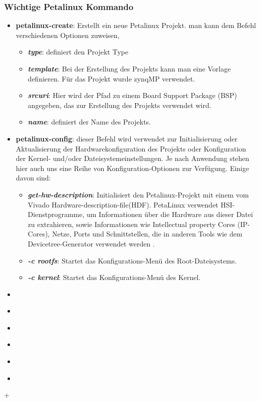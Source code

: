 \subsubsection{Wichtige Petalinux Kommando}
\begin{itemize}
	\item \textbf{petalinux-create}: Erstellt ein neue Petalinux Projekt. man kann dem Befehl verschiedenen Optionen zuweisen, 
	\begin{itemize}
		\item \textbf{\emph{type}}: definiert den Projekt Type
		\item \textbf{\emph{template}}: Bei der Erstellung des Projekts kann man eine Vorlage definieren. Für das Projekt wurde zynqMP verwendet.
		\item \textbf{\emph{srcuri}}: Hier wird der Pfad zu einem Board Support Package (BSP) angegeben, das zur Erstellung des Projekts verwendet wird. 
		\item \textbf{\emph{name}}: definiert der Name des Projekts. 
	\end{itemize}
	\item \textbf{petalinux-config}: dieser Befehl wird verwendet zur Initialisierung oder Aktualisierung der Hardwarekonfiguration des Projekts oder Konfiguration der Kernel- und/oder Dateisystemeinstellungen. Je nach Anwendung stehen hier auch uns eine Reihe von Konfiguration-Optionen zur Verfügung. Einige davon sind:
	\begin{itemize}
		\item \textbf{\emph{get-hw-description}}: Initialisiert den Petalinux-Projekt mit einem vom Vivado Hardware-description-file(HDF). PetaLinux verwendet HSI-Dienstprogramme, um Informationen über die Hardware aus dieser Datei zu extrahieren, sowie Informationen wie Intellectual property Cores (IP-Cores), Netze, Ports und Schnittstellen, die in anderen Tools wie dem Devicetree-Generator verwendet werden .
		\item \textbf{\emph{-c rootfs}}: Startet das Konfigurations-Menü des Root-Dateisystems.
		\item \textbf{\emph{-c kernel}}: Startet das Konfigurations-Menü des Kernel. 
	\end{itemize}
	\item \textbf{}
	\item \textbf{}
	\item \textbf{}
	\item \textbf{}
	\item \textbf{}
	\item \textbf{}
	
\end{itemize}+